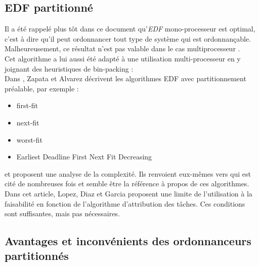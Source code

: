 \documentclass[11pt,a4paper,oneside]{report}
\begin{document}
\subsection{EDF partitionné}
Il a été rappelé plus tôt dans ce document qu'\textit{EDF} mono-processeur est optimal, 
c'est à dire qu'il peut ordonnancer tout type de système qui est ordonnançable. 
Malheureusement, ce résultat n'est pas valable dans le cas multiprocesseur \cite{dertouzos_multiprocessor_1989}.\\

Cet algorithme a lui aussi été adapté à une utilisation multi-processeur en y joignant 
des heuristiques de bin-packing : \\
Dans \cite{pereira_zapata_edf_2005}, Zapata et Alvarez décrivent les algorithmes 
EDF avec partitionnement préalable, par exemple : \\
\begin{itemize}
	\item first-fit
	\item next-fit
	\item worst-fit
	\item Earliest Deadline First Next Fit Decreasing
\end{itemize}
et proposent une analyse de la complexité. Ils renvoient eux-mêmes vers 
\cite{lopez_utilization_2004} 
qui est cité de nombreuses fois et semble être la référence à propos de ces algorithmes. 
Dans cet article, Lopez, Diaz et Garcia proposent une limite de l'utilisation à la 
faisabilité en fonction de l'algorithme d'attribution des tâches. Ces conditions 
sont suffisantes, mais pas nécessaires.\\ %



\subsection{Avantages et inconvénients des ordonnanceurs partitionnés}
\end{document}
